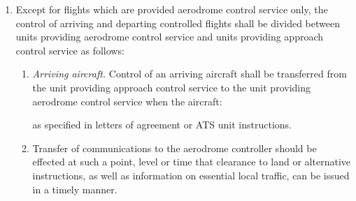 \documentclass[../main.tex]{subfiles}
\begin{document}
    \begin{enumerate}
        \item Except for flights which are provided aerodrome control service only, the control of arriving and departing controlled flights shall be divided between units providing aerodrome control service and units providing approach control service as follows:
        
        \begin{enumerate}
            \item \textit{Arriving aircraft.} Control of an arriving aircraft shall be transferred from the unit providing approach control service to the unit providing aerodrome control service when the aircraft:
            
            
            \noindent as specified in letters of agreement or ATS unit instructions.
            
            \item \label{4.3.2.1.2} Transfer of communications to the aerodrome controller should be effected at such a point, level or time that clearance to land or alternative instructions, as well as information on essential local traffic, can be issued in a timely manner. \par
            

\end{enumerate}
\end{enumerate}
\end{document}
